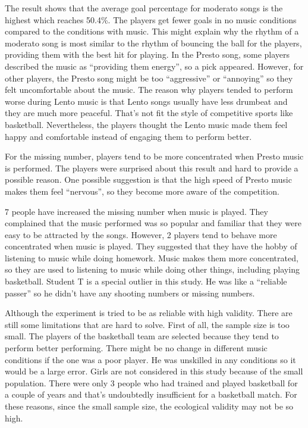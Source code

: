 \documentclass[man,floatsintext]{apa7}
\begin{document}
The result shows that the average goal percentage for moderato songs is the highest which reaches 50.4\%. The players get fewer goals in no music conditions compared to the conditions with music. This might explain why the rhythm of a moderato song is most similar to the rhythm of bouncing the ball for the players, providing them with the best hit for playing. In the Presto song, some players described the music as ``providing them energy'', so a pick appeared. However, for other players, the Presto song might be too ``aggressive'' or ``annoying'' so they felt uncomfortable about the music. The reason why players tended to perform worse during Lento music is that Lento songs usually have less drumbeat and they are much more peaceful. That's not fit the style of competitive sports like basketball. Nevertheless, the players thought the Lento music made them feel happy and comfortable instead of engaging them to perform better.

For the missing number, players tend to be more concentrated when Presto music is performed. The players were surprised about this result and hard to provide a possible reason. One possible suggestion is that the high speed of Presto music makes them feel ``nervous'', so they become more aware of the competition. 

7 people have increased the missing number when music is played. They complained that the music performed was so popular and familiar that they were easy to be attracted by the songs. However, 2 players tend to behave more concentrated when music is played. They suggested that they have the hobby of listening to music while doing homework. Music makes them more concentrated, so they are used to listening to music while doing other things, including playing basketball. Student T is a special outlier in this study. He was like a ``reliable passer'' so he didn't have any shooting numbers or missing numbers.

Although the experiment is tried to be as reliable with high validity. There are still some limitations that are hard to solve. First of all, the sample size is too small. The players of the basketball team are selected because they tend to perform better performing. There might be no change in different music conditions if the one was a poor player. He was unskilled in any conditions so it would be a large error. Girls are not considered in this study because of the small population. There were only 3 people who had trained and played basketball for a couple of years and that's undoubtedly insufficient for a basketball match. For these reasons, since the small sample size, the ecological validity may not be so high.
\end{document}

